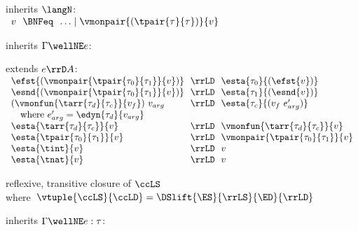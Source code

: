 \begin{flushleft}

\begin{minipage}[t]{\columnwidth}
 inherits $\langN$:\\
$\begin{array}{l@{~~}c@{~~}l}
  v & \BNFeq & \ldots \mid \vmonpair{(\tpair{\tau}{\tau})}{v}
\end{array}$

\medskip
{} inherits $\Gamma \wellNE e$:
\begin{mathpar}
\end{mathpar}

\medskip
{} extends $e \rrD A$:\\
$\begin{array}{l@{~~}c@{~~}l}
  \efst{(\vmonpair{\tpair{\tau_0}{\tau_1}}{v})} & \rrLD & \esta{\tau_0}{(\efst{v})}
\\
  \esnd{(\vmonpair{\tpair{\tau_0}{\tau_1}}{v})} & \rrLD & \esta{\tau_1}{(\esnd{v})}
\\
  (\vmonfun{\tarr{\tau_d}{\tau_c}}{v_f})~v_{arg} & \rrLD & \esta{\tau_c}{(v_f~e_{arg}')}
\\ \multicolumn{3}{l}{\mbox{\quad where $e_{arg}' = \edyn{\tau_d}{v_{arg}}$}}
\\
  \esta{\tarr{\tau_d}{\tau_c}}{v} & \rrLD & \vmonfun{\tarr{\tau_d}{\tau_c}}{v}
\\
  \esta{\tpair{\tau_0}{\tau_1}}{v} & \rrLD & \vmonpair{\tpair{\tau_0}{\tau_1}}{v}
\\
  \esta{\tint}{v} & \rrLD & v
\\
  \esta{\tnat}{v} & \rrLD & v
\end{array}$

\medskip
{} reflexive, transitive closure of $\ccLS$\\
\mbox{\quad where $\vtuple{\ccLS}{\ccLD} = \DSlift{\ES}{\rrLS}{\ED}{\rrLD}$}
\smallskip
\end{minipage}\hspace{\columnsep}%
\begin{minipage}[t]{\columnwidth}
 inherits $\Gamma \wellNE e : \tau$:
\begin{mathpar}
\end{mathpar}


\end{minipage}
\end{flushleft}
